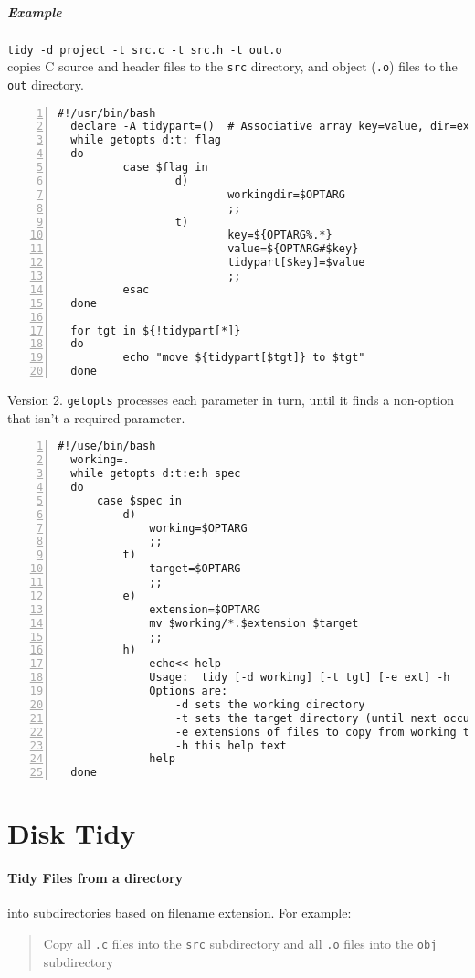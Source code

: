 \documentclass{article}
\begin{document}
\subparagraph{Example} \texttt{tidy -d project -t src.c -t src.h -t out.o}\\
copies C source and header files to the \texttt{src} directory, and object (\texttt{.o}) files to the \texttt{out} directory.
\begin{Verbatim}[numbers=left,gobble=2]
  #!/usr/bin/bash
  declare -A tidypart=()  # Associative array key=value, dir=ext
  while getopts d:t: flag
  do
          case $flag in
                  d)
                          workingdir=$OPTARG
                          ;;
                  t)
                          key=${OPTARG%.*}
                          value=${OPTARG#$key}
                          tidypart[$key]=$value
                          ;;
          esac
  done

  for tgt in ${!tidypart[*]}
  do
          echo "move ${tidypart[$tgt]} to $tgt"
  done
\end{Verbatim}
Version 2.  \texttt{getopts} processes each parameter in turn, until it finds a non-option that isn't a required parameter.
\begin{Verbatim}[numbers=left,gobble=2]
  #!/use/bin/bash
  working=.
  while getopts d:t:e:h spec
  do
      case $spec in
          d)
              working=$OPTARG
              ;;
          t)
              target=$OPTARG
              ;;
          e)
              extension=$OPTARG
              mv $working/*.$extension $target
              ;;
          h)
              echo<<-help
              Usage:  tidy [-d working] [-t tgt] [-e ext] -h
              Options are:
                  -d sets the working directory
                  -t sets the target directory (until next occurrence of -t)
                  -e extensions of files to copy from working to target (no dot needed)
                  -h this help text
              help
  done
\end{Verbatim}

\section{Disk Tidy}
\paragraph{Tidy Files from a directory} into subdirectories based on filename extension.  For example:
\begin{quote}
  Copy all \texttt{.c} files into the \texttt{src} subdirectory and all \texttt{.o} files into the \texttt{obj} subdirectory
\end{quote}
\newcommand{\command}[1]{\texttt{#1}}
\newcommand{\optionarg}[2]{$[$\texttt{#1} \texttt{\emph{#2}}$]$}
\newcommand{\argument}[1]{$\langle$\texttt{\emph{#1}}$\rangle$}
\newcommand{\arguments}[1]{\argument{#1}\ldots}
\end{document}
